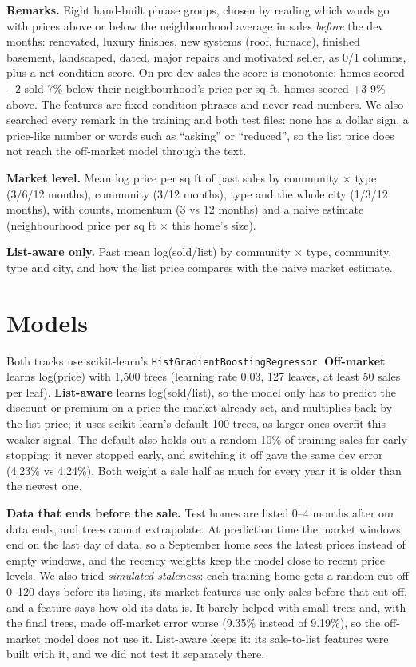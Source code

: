 \documentclass[11pt]{article}
\begin{document}
\textbf{Remarks.} Eight hand-built phrase groups, chosen by reading which words go with prices above
or below the neighbourhood average in sales \emph{before} the dev months: renovated, luxury finishes,
new systems (roof, furnace), finished basement, landscaped, dated, major repairs and motivated
seller, as 0/1 columns, plus a net condition score. On pre-dev sales the score is monotonic:
homes scored $-2$ sold 7\% below their neighbourhood's price per sq ft, homes scored $+3$ 9\% above.
The features are fixed condition phrases and never read numbers. We also searched every remark in
the training and both test files: none has a dollar sign, a price-like number or words such as
``asking'' or ``reduced'', so the list price does not reach the off-market model through the text.

\textbf{Market level.} Mean log price per sq ft of past sales by community $\times$ type
(3/6/12 months), community (3/12 months), type and the whole city (1/3/12 months), with counts, momentum
(3 vs 12 months) and a naive estimate (neighbourhood price per sq ft $\times$ this home's size).

\textbf{List-aware only.} Past mean log(sold/list) by community $\times$ type, community, type and city,
and how the list price compares with the naive market estimate.

\section{Models}
Both tracks use scikit-learn's \texttt{HistGradientBoostingRegressor}.
\textbf{Off-market} learns log(price) with 1,500 trees (learning rate 0.03, 127 leaves, at least 50
sales per leaf). \textbf{List-aware} learns log(sold/list), so the model only has to predict the
discount or premium on a price the market already set, and multiplies back by the list price; it uses
scikit-learn's default 100 trees, as larger ones overfit this weaker signal. The default also
holds out a random 10\% of training sales for early stopping; it never stopped early, and switching
it off gave the same dev error (4.23\% vs 4.24\%).
Both weight a sale half as much for every year it is older than the newest one.

\textbf{Data that ends before the sale.} Test homes are listed 0--4 months after our data ends, and
trees cannot extrapolate. At prediction time the market windows end on the last day of data, so a
September home sees the latest prices instead of empty windows, and the recency weights keep the model
close to recent price levels. We also tried \emph{simulated staleness}: each training home gets a random
cut-off 0--120 days before its listing, its market features use only sales before that cut-off, and a
feature says how old its data is. It barely helped with small trees and, with the final trees, made
off-market error worse (9.35\% instead of 9.19\%), so the off-market model does not use it. List-aware
keeps it: its sale-to-list features were built with it, and we did not test it separately there.
\end{document}
